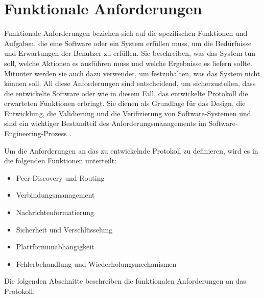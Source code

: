 \section{Funktionale Anforderungen}
\label{section:funktionale_anforderungen}

Funktionale Anforderungen beziehen sich auf die spezifischen Funktionen und Aufgaben, die eine Software oder ein System erfüllen muss, um die Bedürfnisse und Erwartungen der Benutzer zu erfüllen. Sie beschreiben, was das System tun soll, welche Aktionen es ausführen muss und welche Ergebnisse es liefern sollte. Mitunter werden sie auch dazu verwendet, um festzuhalten, was das System nicht können soll. All diese Anforderungen sind entscheidend, um sicherzustellen, dass die entwickelte Software oder wie in diesem Fall, das entwickelte Protokoll die erwarteten Funktionen erbringt. Sie dienen als Grundlage für das Design, die Entwicklung, die Validierung und die Verifizierung von Software-Systemen und sind ein wichtiger Bestandteil des Anforderungsmanagements im Software-Engineering-Prozess \parencite[S. 124-126]{Sommerville_AnfAnalyse}.

Um die Anforderungen an das zu entwickelnde Protokoll zu definieren, wird es in die folgenden
Funktionen unterteilt:

\begin{itemize}
    \item Peer-Discovery und Routing
    \item Verbindungsmanagement
    \item Nachrichtenformatierung
    \item Sicherheit und Verschlüsselung
    \item Plattformunabhängigkeit
    \item Fehlerbehandlung und Wiederholungsmechanismen
\end{itemize}

\noindent Die folgenden Abschnitte beschreiben die funktionalen Anforderungen an das Protokoll.







 